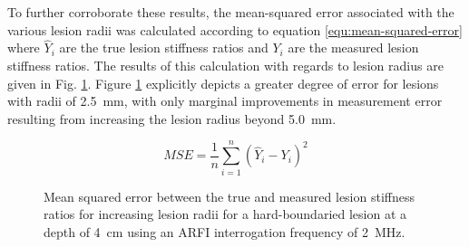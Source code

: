 			To further corroborate these results, the mean-squared error associated with the various lesion radii was calculated according to equation \ref{equ:mean-squared-error} where $\hat{Y}_i$ are the true lesion stiffness ratios and $Y_i$ are the measured lesion stiffness ratios. The results of this calculation with regards to lesion radius are given in Fig. \ref{fig:arfi_radius_mse}. Figure \ref{fig:arfi_radius_mse} explicitly depicts a greater degree of error for lesions with radii of \SI{2.5}{\mm}, with only marginal improvements in measurement error resulting from increasing the lesion radius beyond \SI{5.0}{\mm}.

			\begin{equation}
				\label{equ:mean-squared-error}
				MSE = \frac{1}{n}\sum_{i=1}^n \left(\hat{Y}_i - Y_i\right)^2
			\end{equation}

			\begin{figure}[!htb]
				\centering
				\caption[ARFI imaging-acquired lesion stiffness mean squared error related to lesion radius]{Mean squared error between the true and measured lesion stiffness ratios for increasing lesion radii for a hard-boundaried lesion at a depth of \SI{4}{\cm} using an ARFI interrogation frequency of \SI{2}{\MHz}.}
				\label{fig:arfi_radius_mse}
			\end{figure}


